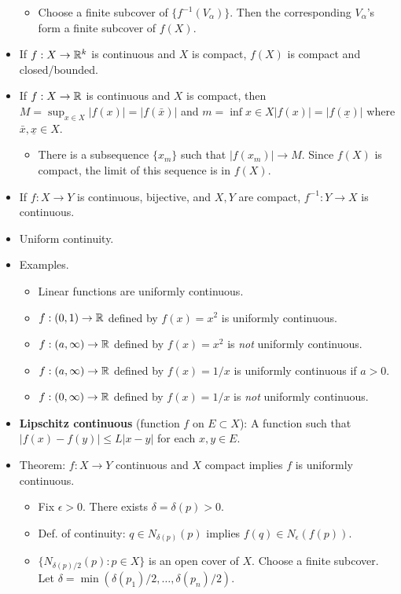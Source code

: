 \documentclass[../../notes.tex]{subfiles}
\begin{document}
\begin{itemize}
\begin{itemize}
        \item Choose a finite subcover of $\{f^{-1}(V_\alpha)\}$. Then the corresponding $V_\alpha$'s form a finite subcover of $f(X)$.
    \end{itemize}
    \item If $f:X\to\mathbb{R}^k$ is continuous and $X$ is compact, $f(X)$ is compact and closed/bounded.
    \item If $f:X\to\mathbb{R}$ is continuous and $X$ is compact, then $M=\sup_{x\in X}|f(x)|=|f(\bar{x})|$ and $m=\inf{x\in X}|f(x)|=|f(\underline{x})|$ where $\bar{x},\underline{x}\in X$.
    \begin{itemize}
        \item There is a subsequence $\{x_m\}$ such that $|f(x_m)|\to M$. Since $f(X)$ is compact, the limit of this sequence is in $f(X)$.
    \end{itemize}
    \item If $f:X\to Y$ is continuous, bijective, and $X,Y$ are compact, $f^{-1}:Y\to X$ is continuous.
    \item Uniform continuity.
    \item Examples.
    \begin{itemize}
        \item Linear functions are uniformly continuous.
        \item $f:(0,1)\to\mathbb{R}$ defined by $f(x)=x^2$ is uniformly continuous.
        \item $f:(a,\infty)\to\mathbb{R}$ defined by $f(x)=x^2$ is \emph{not} uniformly continuous.
        \item $f:(a,\infty)\to\mathbb{R}$ defined by $f(x)=1/x$ is uniformly continuous if $a>0$.
        \item $f:(0,\infty)\to\mathbb{R}$ defined by $f(x)=1/x$ is \emph{not} uniformly continuous.
    \end{itemize}
    \item \textbf{Lipschitz continuous} (function $f$ on $E\subset X$): A function such that $|f(x)-f(y)|\leq L|x-y|$ for each $x,y\in E$.
    \item Theorem: $f:X\to Y$ continuous and $X$ compact implies $f$ is uniformly continuous.
    \begin{itemize}
        \item Fix $\epsilon>0$. There exists $\delta=\delta(p)>0$.
        \item Def. of continuity: $q\in N_{\delta(p)}(p)$ implies $f(q)\in N_\epsilon(f(p))$.
        \item $\{N_{\delta(p)/2}(p):p\in X\}$ is an open cover of $X$. Choose a finite subcover. Let $\delta=\min(\delta(p_1)/2,\dots,\delta(p_n)/2)$.

\end{itemize}
\end{itemize}
\end{document}
